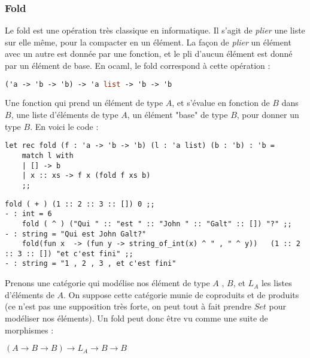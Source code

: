 \documentclass{article}
\begin{document}
\subsubsection{Fold}

Le fold est une opération très classique en informatique. Il s'agit de \textit{plier} une liste sur elle même, pour la compacter en un élément. La façon de \textit{plier} un élément avec un autre est donnée par une fonction, et le pli d'aucun élément est donné par un élément de base. En ocaml, le fold correspond à cette opération :

\begin{lstlisting}[language=Ocaml]
 ('a -> 'b -> 'b) -> 'a list -> 'b -> 'b 
\end{lstlisting}

Une fonction qui prend un élément de type $A$, et s'évalue en fonction de $B$ dans $B$, une liste d'éléments de type $A$,   un élément "base" de type $B$,  pour donner un type $B$. En voici le code :

\begin{lstlisting}[languague=OCaml]
let rec fold (f : 'a -> 'b -> 'b) (l : 'a list) (b : 'b) : 'b = 
    match l with 
    | [] -> b
    | x :: xs -> f x (fold f xs b)
    ;;   
\end{lstlisting}

\begin{lstlisting}[languague=OCaml]
    fold ( + ) (1 :: 2 :: 3 :: []) 0 ;; 
- : int = 6 
    fold ( ^ ) ("Qui " :: "est " :: "John " :: "Galt" :: []) "?" ;; 
- : string = "Qui est John Galt?"
    fold(fun x  -> (fun y -> string_of_int(x) ^ " , " ^ y))   (1 :: 2 :: 3 :: []) "et c'est fini" ;; 
- : string = "1 , 2 , 3 , et c'est fini"
\end{lstlisting}

Prenons une catégorie qui modélise nos élément de type $A$ , $B$, et $L_A$ les listes d'éléments de $A$. On suppose cette catégorie munie de coproduits et de produits (ce n'est pas une supposition très forte, on peut tout à fait prendre $Set$ pour modéliser nos éléments). Un fold peut donc être vu comme une suite de morphismes : 
\begin{center}
$ 
(A \rightarrow B \rightarrow B) \rightarrow L_A \rightarrow B \rightarrow B
$    
\end{center}
\end{document}
